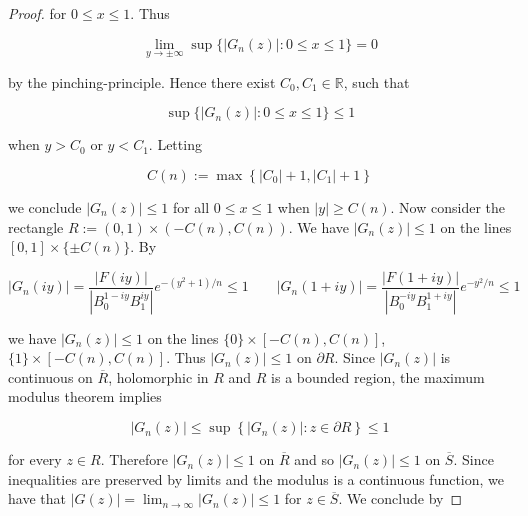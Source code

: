 \begin{proof}
for $0 \leqslant x \leqslant 1$. Thus
	
\begin{equation*}
	\lim_{y \to \pm \infty}\sup\{\left| G_n(z)\right| : 0 \leqslant x \leqslant 1\} = 0
\end{equation*}

by the pinching-principle. Hence there exist $C_0,C_1 \in \mathbb{R}$, such that 

\begin{equation*}
	\sup\{\left| G_n(z)\right| : 0 \leqslant x \leqslant 1\} \leqslant 1
\end{equation*}

when $y > C_0$ or $y < C_1$. Letting

\begin{equation*}
	C(n) := \max\left\{ \left| C_0\right| + 1, \left| C_1 \right| + 1\right\}
\end{equation*}

we conclude $\left| G_n(z) \right| \leqslant 1$ for all $0 \leqslant x \leqslant 1$ when $\left| y \right| \geqslant C(n)$. Now consider the rectangle $R := \left(0,1\right) \times \left(-C(n),C(n)\right)$. We have $\left| G_n(z) \right| \leqslant 1$ on the lines $[0,1] \times \{\pm C(n)\}$. By

\begin{equation*}
	\left| G_n(iy)\right| = \frac{\left| F(iy)\right|}{\left| B_0^{1 - iy} B_1^{iy}\right|}e^{-\left( y^2 + 1 \right)/n} \leqslant 1 \qquad \left| G_n(1 + iy)\right| =	\frac{\left| F(1 + iy)\right|}{\left| B_0^{-iy}B_1^{1 + iy}\right|}e^{-y^2/n} \leqslant 1
\end{equation*}

we have $\left| G_n(z)\right| \leqslant 1$ on the lines $\{0\} \times [-C(n),C(n)]$, $\{1\} \times [-C(n),C(n)]$. Thus $\left| G_n(z) \right| \leqslant 1$ on $\partial R$. Since $\left| G_n(z)\right|$ is continuous on $\overline{R}$, holomorphic in $R$ and $R$ is a bounded region, the maximum modulus theorem implies

\begin{equation*}
	\left| G_n(z)\right| \leqslant \sup\left\{ \left|G_n(z) \right| : z \in \partial R \right\} \leqslant 1
\end{equation*}

for every $z \in R$. Therefore $\left| G_n(z) \right| \leqslant 1$ on $\overline{R}$ and so $\left| G_n(z) \right| \leqslant 1$ on $\overline{S}$. Since inequalities are preserved by limits and the modulus is a continuous function, we have that $\left| G(z) \right| = \lim_{n \to \infty} \left| G_n(z) \right| \leqslant 1$ for $z \in \overline{S}$. We conclude by 


\end{proof}
